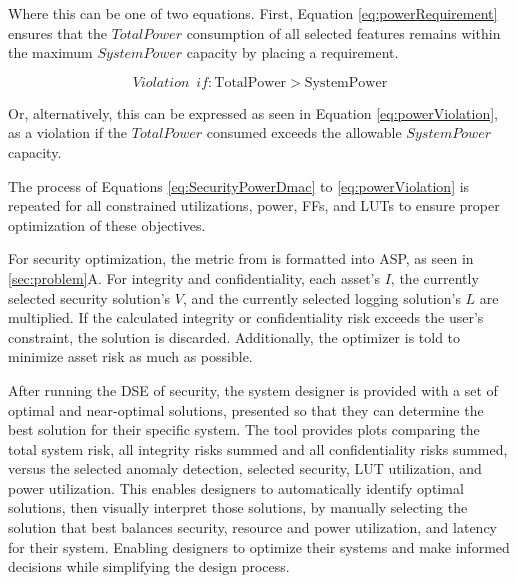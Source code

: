 Where this can be one of two equations. First, Equation \ref{eq:powerRequirement} ensures that the \(TotalPower\) consumption of all selected features remains within the maximum \(SystemPower\) capacity by placing a requirement.

\begin{equation}
\label{eq:powerViolation}
Violation \enspace  if : \text{TotalPower} > \text{SystemPower}
\end{equation}

Or, alternatively, this can be expressed as seen in Equation \ref{eq:powerViolation}, as a violation if the \(TotalPower\) consumed exceeds the allowable \(SystemPower\) capacity.

The process of Equations \ref{eq:SecurityPowerDmac} to \ref{eq:powerViolation} is repeated for all constrained utilizations, power, FFs, and LUTs to ensure proper optimization of these objectives. 


For security optimization, the metric from \cite{butka_measuring_2025} is formatted into ASP, as seen in \ref{sec:problem}A. For integrity and confidentiality, each asset's \(I\), the currently selected security solution's \(V\), and the currently selected logging solution's \(L\) are multiplied. If the calculated integrity or confidentiality risk exceeds the user's constraint, the solution is discarded. Additionally, the optimizer is told to minimize asset risk as much as possible. 


After running the DSE of security, the system designer is provided with a set of optimal and near-optimal solutions, presented so that they can determine the best solution for their specific system. The tool provides plots comparing the total system risk, all integrity risks summed and all confidentiality risks summed, versus the selected anomaly detection, selected security, LUT utilization, and power utilization.
This enables designers to automatically identify optimal solutions, then visually interpret those solutions, 
by manually selecting the solution that best balances security, resource and power utilization, and latency for their system. Enabling designers to optimize their systems and make informed decisions while simplifying the design process.

